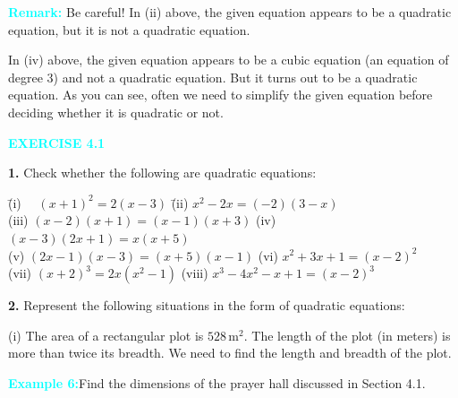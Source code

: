 \documentclass[a4paper,12pt]{article}
\begin{document}
\vspace{1em}

\noindent \textcolor{cyan}{\textbf{Remark:}} Be careful! In (ii) above, the given equation appears to be a quadratic equation, but it is not a quadratic equation.

 In (iv) above, the given equation appears to be a cubic equation (an equation of degree 3) and not a quadratic equation. But it turns out to be a quadratic equation. As you can see, often we need to simplify the given equation before deciding whether it is quadratic or not.

\vspace{1.5em}
\begin{center}
    \textcolor{cyan}{\textbf{EXERCISE 4.1}}
\end{center}
\vspace{0.5em}

\noindent \textbf{1.} Check whether the following are quadratic equations:

\begin{tabbing}
\hspace{2em} \= (i) \(\quad (x+1)^2 = 2(x-3)\) \hspace{2.8cm} \quad\= (ii) \(x^2 - 2x = (-2)(3 - x)\) \\
\> (iii) \((x-2)(x+1) = (x-1)(x+3)\) \hspace{1.1cm}  (iv) \((x-3)(2x+1) = x(x+5)\) \\
\> (v) \((2x - 1)(x - 3) = (x + 5)(x - 1)\) \hspace{1.1cm}  (vi) \(x^2 + 3x + 1 = (x - 2)^2\) \\
\> (vii) \((x + 2)^3 = 2x(x^2 - 1)\) \>\hspace{0.1cm}(viii) \(x^3 - 4x^2 - x + 1 = (x - 2)^3\)
\end{tabbing}

\vspace{1em}

\noindent \textbf{2.} Represent the following situations in the form of quadratic equations:

\noindent (i) The area of a rectangular plot is \(528 \, \text{m}^2\). The length of the plot (in meters) is more than twice its breadth. We need to find the length and breadth of the plot.

\newpage
{} 
\fancyhead[R]{\textcolor{cyan}{MATHEMATICS}} 
\fancyhead[c]{}
\noindent\textcolor{cyan}{\textbf{Example 6:}}Find the dimensions of the prayer hall discussed in Section 4.1.
\end{document}
